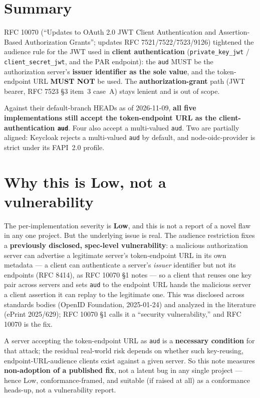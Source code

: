 \documentclass[10pt,twocolumn]{article}
\newcommand{\code}[1]{\texttt{\small #1}}
\begin{document}
\section{Summary}
RFC 10070 (``Updates to OAuth 2.0 JWT Client Authentication and Assertion-Based
Authorization Grants''; updates RFC 7521/7522/7523/9126) tightened the audience
rule for the JWT used in \textbf{client authentication} (\code{private\_key\_jwt} /
\code{client\_secret\_jwt}, and the PAR endpoint): the \code{aud} MUST be the
authorization server's \textbf{issuer identifier as the sole value}, and the
token-endpoint URL \textbf{MUST NOT} be used. The \textbf{authorization-grant}
path (JWT bearer, RFC 7523 \S3 item~3 case~A) stays lenient and is out of scope.

Against their default-branch HEADs as of 2026-11-09, \textbf{all five implementations
still accept the token-endpoint URL as the client-authentication \code{aud}}. Four
also accept a multi-valued \code{aud}. Two are partially aligned: Keycloak rejects
a multi-valued \code{aud} by default, and node-oidc-provider is strict under its
FAPI~2.0 profile.

\section{Why this is Low, not a vulnerability}
The per-implementation severity is \textbf{Low}, and this is not a report of a
novel flaw in any one project. But the underlying issue is real. The audience
restriction fixes a \textbf{previously disclosed, spec-level vulnerability}: a
malicious authorization server can advertise a legitimate server's token-endpoint
URL in its own metadata --- a client can authenticate a server's \emph{issuer}
identifier but not its endpoints (RFC 8414), as RFC 10070 \S1 notes --- so a client
that reuses one key pair across servers and sets \code{aud} to the endpoint URL
hands the malicious server a client assertion it can replay to the legitimate one.
This was disclosed across standards bodies (OpenID Foundation, 2025-01-24) and
analyzed in the literature (ePrint 2025/629); RFC 10070 \S1 calls it a ``security
vulnerability,'' and RFC 10070 is the fix.

A server accepting the token-endpoint URL as \code{aud} is a \textbf{necessary
condition} for that attack; the residual real-world risk depends on whether such
key-reusing, endpoint-URL-audience clients exist against a given server. So this
note measures \textbf{non-adoption of a published fix}, not a latent bug in any
single project --- hence Low, conformance-framed, and suitable (if raised at all)
as a conformance heads-up, not a vulnerability report.
\end{document}
